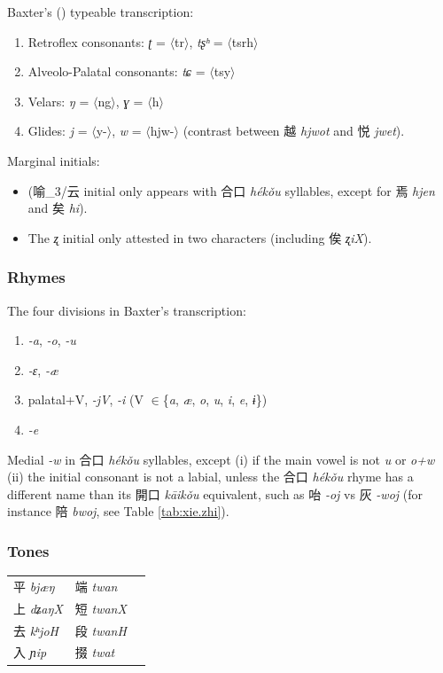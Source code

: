 \documentclass[oneside,a4paper,11pt]{article}
\newcommand{\ipa}[1]{{\phon\textit{#1}}}
\newcommand{\zh}[1]{{\cn #1}}
\newcommand{\zhc}[2]{\zh{#1} \ipa{#2}}
\newcommand{\translit}[1]{$\langle$#1$\rangle$}
\begin{document}
Baxter's (\citeyear{baxter92}) typeable transcription: 
\begin{enumerate}
\item Retroflex consonants: \ipa{ʈ} = \translit{tr}, \ipa{tʂʰ}  =  \translit{tsrh} 
\item Alveolo-Palatal consonants: \ipa{tɕ} = \translit{tsy}
\item Velars: \ipa{ŋ} = \translit{ng}, \ipa{ɣ} = \translit{h}
\item Glides: \ipa{j} = \translit{y-}, \ipa{w} = \translit{hjw-} (contrast between \zhc{越}{hjwot}  and \zhc{悦}{jwet}).
\end{enumerate}

Marginal initials:
\begin{itemize}
\item 
(\zh{喻}_3/\zh{云} initial only appears with \zhc{合口}{hékǒu} syllables, except for \zhc{焉}{hjen} and \zhc{矣}{hi}).
\item The \ipa{ʐ} initial only attested in two characters (including \zhc{俟}{ʐiX}).
\end{itemize}

\subsubsection{Rhymes} \label{sec:rhymes}

The four divisions in Baxter's transcription:
\begin{enumerate}
\item \ipa{-a}, \ipa{-o}, \ipa{-u}
\item \ipa{-ɛ}, \ipa{-æ}
\item palatal+V, \ipa{-jV}, \ipa{-i} (V $\in$\{\ipa{a}, \ipa{æ}, \ipa{o}, \ipa{u},  \ipa{i}, \ipa{e}, \ipa{ɨ}\})
\item \ipa{-e}
\end{enumerate}

Medial \ipa{-w} in \zhc{合口}{hékǒu} syllables, except (i) if the main vowel is not \ipa{u} or \ipa{o+w} (ii) the initial consonant is not a labial, unless the \zhc{合口}{hékǒu} rhyme has a different name than its \zhc{開口}{kāikǒu} equivalent, such as \zhc{咍}{-oj} vs \zhc{灰}{-woj} (for instance \zhc{陪}{bwoj}, see Table \ref{tab:xie.zhi}).

\subsubsection{Tones}

\begin{tabular}{lll} 
\zhc{平}{bjæŋ} & \zhc{端}{twan} \\
\zhc{上}{dʑaŋX} & \zhc{短}{twanX} \\
\zhc{去}{kʰjoH} & \zhc{段}{twanH} \\
\zhc{入}{ɲip} & \zhc{掇}{twat} \\
\end{tabular}
\end{document}

